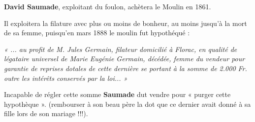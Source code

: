 \vspace{0.35cm}

\textbf{David Saumade}, exploitant du foulon, achètera le Moulin en 1861.

\vspace{0.35cm}

Il exploitera la filature avec plus ou moins de bonheur, au moins jusqu’à la mort
de sa femme, puisqu’en mars 1888 le moulin fut hypothéqué :

\vspace{0.25cm}

\begin{flushleft}
\hspace{0.35cm}
\parbox{0.88\textwidth}{
\textit{
« ... au profit de M. Jules Germain, filateur domicilié à Florac, en qualité de
légataire universel de Marie Eugénie Germain, décédée, femme du vendeur
pour garantie de reprises dotales de cette dernière se portant à la somme de
2.000 Fr. outre les intérêts conservés par la loi... »
}
}
\end{flushleft}

\vspace{0.25cm}

Incapable de régler cette somme \textbf{Saumade} dut vendre pour « purger cette
hypothèque ». (rembourser à son beau père la dot que ce dernier avait donné à sa
fille lors de son mariage !!!).
